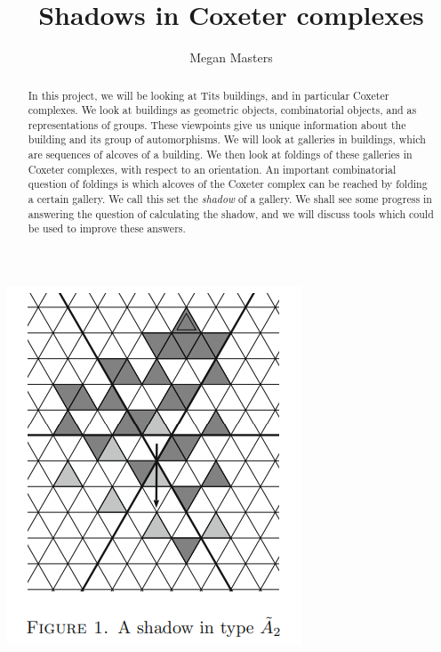 \documentclass[11pt]{article}
\begin{document}
\newtheorem{theorem}{Theorem}
\theoremstyle{definition}
\newtheorem{definition}{Definition}
\newtheorem{proposition}{Proposition}
\newtheorem{example}{Example}
\newtheorem{lemma}{Lemma}
\newtheorem{corollary}{Corollary}
\newcommand{\uw}{\mathcal{U}(W,X)}
\newcommand{\W}{$(W,S)$}
\newcommand{\ix}{\textit}
\newcommand{\tr}{\textcolor{red}}
\newcommand{\sg}{$\Sigma$}


\title{Shadows in Coxeter complexes}
\author{Megan Masters}
\maketitle



\begin{abstract}
    


In this project, we will be looking at Tits buildings, and in particular Coxeter complexes. We look at buildings as geometric objects, combinatorial objects, and as representations of groups. These viewpoints give us unique information about the building and its group of automorphisms. We will look at galleries in buildings, which are sequences of alcoves of a building. We then look at foldings of these galleries in Coxeter complexes, with respect to an orientation. An important combinatorial question of foldings is which alcoves of the Coxeter complex can be reached by folding a certain gallery. We call this set the \ix{shadow} of a gallery. We shall see some progress in answering the question of calculating the shadow, and we will discuss tools which could be used to improve these answers. 

\end{abstract}
\begin{center}
    \includegraphics[scale=1.5]{Screenshot 2023-03-28 114049.png}\\
\end{center}
\newpage
\tableofcontents
\newpage
{}
\end{document}
